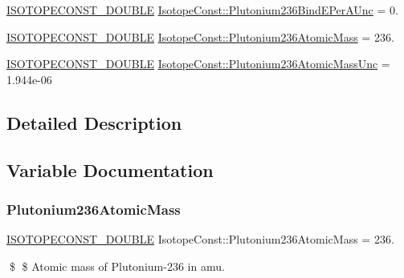 \begin{DoxyCompactItemize}
\mbox{\hyperlink{group___isotope_const-_macros_ga8f45a7272ce02c0b4c65c44636ed719a}{I\+S\+O\+T\+O\+P\+E\+C\+O\+N\+S\+T\+\_\+\+D\+O\+U\+B\+LE}} \mbox{\hyperlink{group___isotope_const-_plutonium-_pu236_ga408133e6ed76b70b8509504eb2d8dae2}{Isotope\+Const\+::\+Plutonium236\+Bind\+E\+Per\+A\+Unc}} = 0.
\item 
\mbox{\hyperlink{group___isotope_const-_macros_ga8f45a7272ce02c0b4c65c44636ed719a}{I\+S\+O\+T\+O\+P\+E\+C\+O\+N\+S\+T\+\_\+\+D\+O\+U\+B\+LE}} \mbox{\hyperlink{group___isotope_const-_plutonium-_pu236_ga1ddd30b57f3173a7c387e98ed69a341c}{Isotope\+Const\+::\+Plutonium236\+Atomic\+Mass}} = 236.
\item 
\mbox{\hyperlink{group___isotope_const-_macros_ga8f45a7272ce02c0b4c65c44636ed719a}{I\+S\+O\+T\+O\+P\+E\+C\+O\+N\+S\+T\+\_\+\+D\+O\+U\+B\+LE}} \mbox{\hyperlink{group___isotope_const-_plutonium-_pu236_gaa64adf29b5a1f18fe10174162254e456}{Isotope\+Const\+::\+Plutonium236\+Atomic\+Mass\+Unc}} = 1.\+944e-\/06
\end{DoxyCompactItemize}


\subsection{Detailed Description}


\subsection{Variable Documentation}
\mbox{\label{group___isotope_const-_plutonium-_pu236_ga1ddd30b57f3173a7c387e98ed69a341c}} 
\subsubsection{\texorpdfstring{Plutonium236\+Atomic\+Mass}{Plutonium236AtomicMass}}
{\footnotesize\ttfamily \mbox{\hyperlink{group___isotope_const-_macros_ga8f45a7272ce02c0b4c65c44636ed719a}{I\+S\+O\+T\+O\+P\+E\+C\+O\+N\+S\+T\+\_\+\+D\+O\+U\+B\+LE}} Isotope\+Const\+::\+Plutonium236\+Atomic\+Mass = 236.}

\$ \$ Atomic mass of Plutonium-\/236 in amu. \mbox{\label{group___isotope_const-_plutonium-_pu236_gaa64adf29b5a1f18fe10174162254e456}} 
